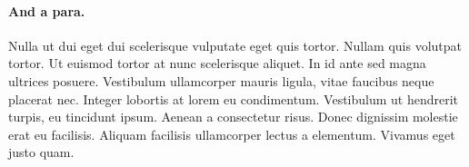 \paragraph{And a para.} Nulla ut dui eget dui scelerisque vulputate eget quis tortor. Nullam
quis volutpat tortor. Ut euismod tortor at nunc scelerisque
aliquet. In id ante sed magna ultrices posuere. Vestibulum ullamcorper
mauris ligula, vitae faucibus neque placerat nec. Integer lobortis at
lorem eu condimentum. Vestibulum ut hendrerit turpis, eu tincidunt
ipsum. Aenean a consectetur risus. Donec dignissim molestie erat eu
facilisis. Aliquam facilisis ullamcorper lectus a elementum. Vivamus
eget justo quam.
